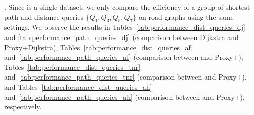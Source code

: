 


.
%
Since \dblpone is a single dataset, we only compare the efficiency of a group of shortest path and distance queries $\{Q_1, Q_3, Q_5, Q_7\}$  on road graphs using the same settings.
We observe the results in
Tables~\ref{tab:performance_dist_queries_dj} and \ref{tab:performance_path_queries_dj} (comparison between Dijkstra and Proxy+Dijkstra), Tables~\ref{tab:performance_dist_queries_af} and~\ref{tab:performance_path_queries_af} (comparison between \arcflag and Proxy+\arcflag), Tables~\ref{tab:performance_dist_queries_tnr} and~\ref{tab:performance_path_queries_tnr} (comparison between \tnr and Proxy+\tnr), and Tables~\ref{tab:performance_dist_queries_ah} and~\ref{tab:performance_path_queries_ah} (comparison between \ah and Proxy+\ah), respectively.








